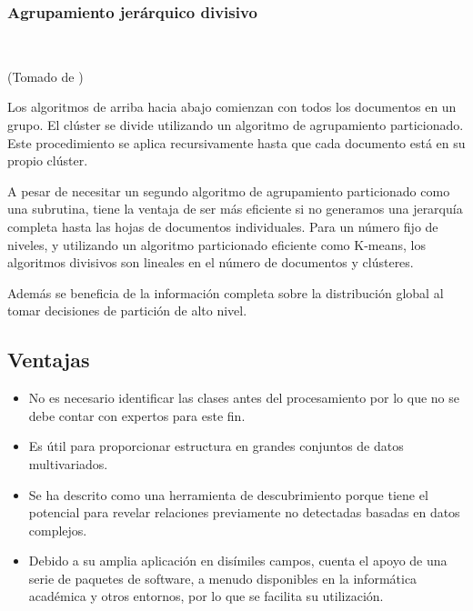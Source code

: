 \documentclass{llncs}
\begin{document}
\subsubsection{Agrupamiento jer\'arquico divisivo}

\textcolor{white}{.}
\begin{flushright}
	\scriptsize*(Tomado de \cite{B1})
	\normalsize
\end{flushright}

\vspace{0.5em}
Los algoritmos de arriba hacia abajo comienzan con todos los documentos en un grupo. El clúster se divide utilizando un algoritmo de agrupamiento particionado. Este procedimiento se aplica recursivamente hasta que cada documento está en su
propio clúster.

A pesar de necesitar un segundo algoritmo de agrupamiento particionado como una subrutina, tiene la ventaja de ser más eficiente si no generamos una jerarquía completa hasta las hojas de documentos individuales. Para un número fijo de niveles, y utilizando un algoritmo particionado eficiente como K-means, los algoritmos divisivos son lineales en el número de documentos y clústeres.

Adem\'as se beneficia de la información completa sobre la distribución global al tomar decisiones de partición de alto nivel.

\subsection{Ventajas} 

\begin{itemize}
	\item No es necesario identificar las clases antes del procesamiento por lo que no se debe contar con expertos para este fin.
	
	\item Es útil para proporcionar estructura en grandes conjuntos de datos multivariados.
	
	\item Se ha descrito como una herramienta de descubrimiento porque tiene el potencial para revelar relaciones previamente no detectadas basadas en datos complejos.
	
	\item Debido a su amplia aplicación en dis\'imiles campos, cuenta el apoyo de una serie de paquetes de software, a menudo disponibles en la informática académica y otros entornos, por lo que se facilita su utilizaci\'on.
\end{itemize}
\end{document}
